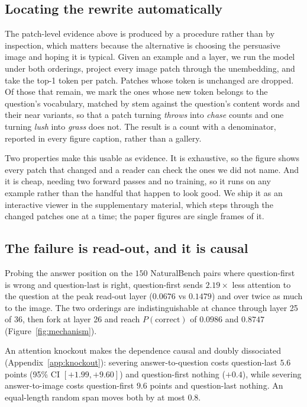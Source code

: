 \subsection{Locating the rewrite automatically}
\label{sec:background-diff}

The patch-level evidence above is produced by a procedure rather than by
inspection, which matters because the alternative is choosing the persuasive
image and hoping it is typical. Given an example and a layer, we run the model
under both orderings, project every image patch through the unembedding, and
take the top-1 token per patch. Patches whose token is unchanged are dropped.
Of those that remain, we mark the ones whose new token belongs to the
question's vocabulary, matched by stem against the question's content words and
their near variants, so that a patch turning \emph{throws} into \emph{chase}
counts and one turning \emph{lush} into \emph{grass} does not. The result is a
count with a denominator, reported in every figure caption, rather than a
gallery.

Two properties make this usable as evidence. It is exhaustive, so the figure
shows every patch that changed and a reader can check the ones we did not name.
And it is cheap, needing two forward passes and no training, so it runs on any
example rather than the handful that happen to look good. We ship it as an
interactive viewer in the supplementary material, which steps through the
changed patches one at a time; the paper figures are single frames of it.

\subsection{The failure is read-out, and it is causal}
\label{sec:background-readout}

Probing the answer position on the $150$ NaturalBench pairs where question-first
is wrong and question-last is right, question-first sends $2.19\times$ less
attention to the question at the peak read-out layer ($0.0676$ vs $0.1479$) and
over twice as much to the image. The two orderings are indistinguishable at
chance through layer 25 of 36, then fork at layer 26 and reach
$P(\text{correct})$ of $0.0986$ and $0.8747$ (Figure~\ref{fig:mechanism}).

An attention knockout makes the dependence causal and doubly dissociated
(Appendix~\ref{app:knockout}): severing answer-to-question costs question-last
$5.6$ points (95\% CI $[+1.99, +9.60]$) and question-first nothing ($+0.4$),
while severing answer-to-image costs question-first $9.6$ points and
question-last nothing. An equal-length random span moves both by at most $0.8$.

